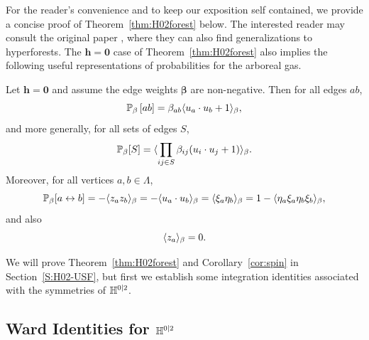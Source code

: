 \documentclass[11pt]{amsart}
\numberwithin{equation}{section}
\numberwithin{theorem}{section}
\newcommand{\cb}[1]{\left[#1\right ]} %
\newcommand{\ab}[1]{\langle #1 \rangle} %
\newcommand{\V}[1]{\boldsymbol{#1}}
\begin{document}
For the reader's convenience and to keep our exposition self
contained, we provide a concise proof of Theorem~\ref{thm:H02forest}
below.  The interested reader may consult the original paper
\cite{MR2110547}, where they can also find generalizations to
hyperforests. The $\V{h}=\V{0}$ case of Theorem~\ref{thm:H02forest}
also implies the following useful representations of probabilities for
the arboreal gas.

\begin{corollary} \label{cor:spin} Let $\V{h}=\V{0}$ and
    assume the edge weights $\V{\beta}$ are non-negative. Then for all edges
  $ab$,
  \begin{equation}
    \label{e:edge-spin}
    \P_\beta\cb{ab}
    =
    \beta_{ab}\ab{ u_a\cdot u_b +1}_\beta,
  \end{equation}
  and more generally, for all sets of edges $S$,
  \begin{equation}
    \label{e:edges-spin}
    \P_\beta[S] = \ab{\prod_{ij \in S} \beta_{ij}
      (u_{i}\cdot u_{j}+1)}_\beta. 
  \end{equation}
  Moreover, for all vertices $a,b \in\Lambda$,
  \begin{equation}
    \label{e:conn-spin}
    \P_\beta[a\leftrightarrow b] = -\avg{z_az_b}_\beta =
    -\avg{u_a\cdot u_b}_\beta  = \avg{\xi_{a}\eta_{b}}_{\beta} = 1-    \ab{\eta_{a}\xi_{a}\eta_{b}\xi_{b}}_{\beta},
  \end{equation}
  and also 
  \begin{equation}
    \label{eq:expz0}
    \langle z_a \rangle_\beta=0.
  \end{equation}
\end{corollary}

We will prove Theorem~\ref{thm:H02forest} and Corollary~\ref{cor:spin}
in Section~\ref{S:H02-USF}, but first we establish some
integration identities associated with the symmetries of $\mathbb{H}^{0|2}$.

\subsection{Ward Identities for $\mathbb{H}^{0|2}$}
\label{sec:hypsym}
\end{document}
